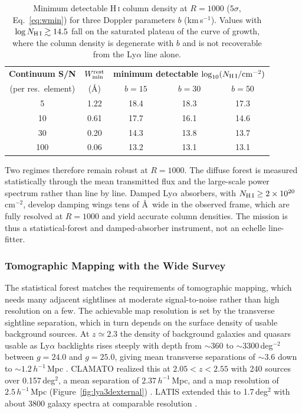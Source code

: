\begin{table}[htbp]
\centering
\sffamily\small
\begin{tabular}{@{}ccccc@{}}
\toprule
\textbf{Continuum S/N} & \textbf{$W_{\min}^{\rm rest}$} & \multicolumn{3}{c}{\textbf{minimum detectable $\log_{10}(N_{\rm H\,I}/{\rm cm^{-2}})$}}\\
(per res.\ element) & (\AA) & $b=15$ & $b=30$ & $b=50$ \\
\midrule
5 & 1.22 & 18.4 & 18.3 & 17.3\\
10 & 0.61 & 17.7 & 16.1 & 14.6\\
30 & 0.20 & 14.3 & 13.8 & 13.7\\
100 & 0.06 & 13.2 & 13.1 & 13.1\\
\bottomrule
\end{tabular}
\caption{Minimum detectable H\,\textsc{i} column density at $R=1000$ ($5\sigma$, Eq.~\eqref{eq:wmin}) for three Doppler parameters $b$ (km\,s$^{-1}$). Values with $\log N_{\rm H\,I}\gtrsim14.5$ fall on the saturated plateau of the curve of growth, where the column density is degenerate with $b$ and is not recoverable from the Ly$\alpha$ line alone.}
\label{tab:lyathresh}
\end{table}

Two regimes therefore remain robust at $R=1000$. The diffuse forest is measured statistically through the mean transmitted flux and the large-scale power spectrum rather than line by line. Damped Ly$\alpha$ absorbers, with $N_{\rm H\,I}\geq2\times10^{20}$\,cm$^{-2}$, develop damping wings tens of \AA\ wide in the observed frame, which are fully resolved at $R=1000$ and yield accurate column densities. The mission is thus a statistical-forest and damped-absorber instrument, not an echelle line-fitter.

\subsubsection{Tomographic Mapping with the Wide Survey}

The statistical forest matches the requirements of tomographic mapping, which needs many adjacent sightlines at moderate signal-to-noise rather than high resolution on a few. The achievable map resolution is set by the transverse sightline separation, which in turn depends on the surface density of usable background sources. At $z\simeq2.3$ the density of background galaxies and quasars usable as Ly$\alpha$ backlights rises steeply with depth from $\sim$360 to $\sim$3300\,deg$^{-2}$ between $g=24.0$ and $g=25.0$, giving mean transverse separations of $\sim3.6$ down to $\sim1.2\,h^{-1}$\,Mpc \cite{lee2014tomo}. CLAMATO realized this at $2.05<z<2.55$ with 240 sources over 0.157\,deg$^2$, a mean separation of $2.37\,h^{-1}$\,Mpc, and a map resolution of $2.5\,h^{-1}$\,Mpc (Figure~\ref{fig:lya3dexternal}) \cite{lee2018clamato}. LATIS extended this to 1.7\,deg$^2$ with about 3800 galaxy spectra at comparable resolution \cite{newman2020latis}.

